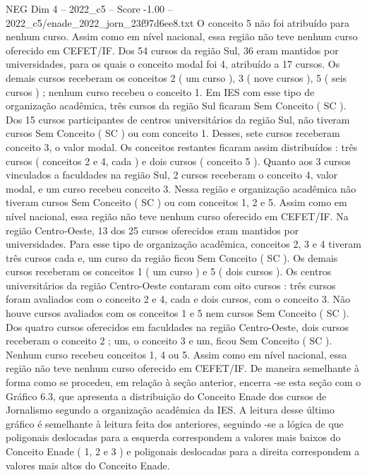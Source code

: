 \begin{textsample}{NEG Dim 4 – 2022\_c5 – Score -1.00 – 2022\_c5/enade\_2022\_jorn\_23f97d6ee8.txt}
O conceito 5 não foi atribuído para nenhum curso.
Assim como em nível nacional, essa região não teve nenhum curso oferecido em CEFET/IF.
Dos 54 cursos da região Sul, 36 eram mantidos por universidades, para os quais o conceito modal foi 4, atribuído a 17 cursos.
Os demais cursos receberam os conceitos 2 ( um curso ), 3 ( nove cursos ), 5 ( seis cursos ) ; nenhum curso recebeu o conceito 1.
Em IES com esse tipo de organização acadêmica, três cursos da região Sul ficaram Sem Conceito ( SC ).
Dos 15 cursos participantes de centros universitários da região Sul, não tiveram cursos Sem Conceito ( SC ) ou com conceito 1.
Desses, sete cursos receberam conceito 3, o valor modal.
Os conceitos restantes ficaram assim distribuídos : três cursos ( conceitos 2 e 4, cada ) e dois cursos ( conceito 5 ).
Quanto aos 3 cursos vinculados a faculdades na região Sul, 2 cursos receberam o conceito 4, valor modal, e um curso recebeu conceito 3.
Nessa região e organização acadêmica não tiveram cursos Sem Conceito ( SC ) ou com conceitos 1, 2 e 5.
Assim como em nível nacional, essa região não teve nenhum curso oferecido em CEFET/IF.
Na região Centro-Oeste, 13 dos 25 cursos oferecidos eram mantidos por universidades.
Para esse tipo de organização acadêmica, conceitos 2, 3 e 4 tiveram três cursos cada e, um curso da região ficou Sem Conceito ( SC ).
Os demais cursos receberam os conceitos 1 ( um curso ) e 5 ( dois cursos ).
Os centros universitários da região Centro-Oeste contaram com oito cursos : três cursos foram avaliados com o conceito 2 e 4, cada e dois cursos, com o conceito 3.
Não houve cursos avaliados com os conceitos 1 e 5 nem cursos Sem Conceito ( SC ).
Dos quatro cursos oferecidos em faculdades na região Centro-Oeste, dois cursos receberam o conceito 2 ; um, o conceito 3 e um, ficou Sem Conceito ( SC ).
Nenhum curso recebeu conceitos 1, 4 ou 5.
Assim como em nível nacional, essa região não teve nenhum curso oferecido em CEFET/IF.
De maneira semelhante à forma como se procedeu, em relação à seção anterior, encerra -se esta seção com o Gráfico 6.3, que apresenta a distribuição do Conceito Enade dos cursos de Jornalismo segundo a organização acadêmica da IES.
A leitura desse último gráfico é semelhante à leitura feita dos anteriores, seguindo -se a lógica de que poligonais deslocadas para a esquerda correspondem a valores mais baixos do Conceito Enade ( 1, 2 e 3 ) e poligonais deslocadas para a direita correspondem a valores mais altos do Conceito Enade.

\end{textsample}
